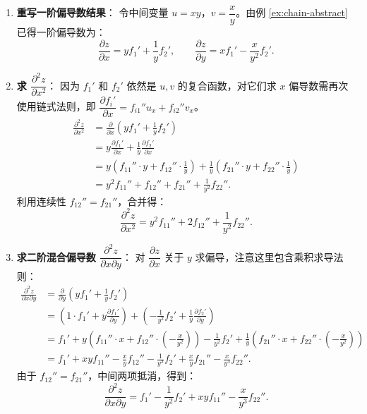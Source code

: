 \documentclass[lang=cn,11pt]{elegantbook}
\begin{document}
\begin{solution}
\begin{enumerate}
  \item \textbf{重写一阶偏导数结果}：
  令中间变量 $u=xy$，$v=\dfrac{x}{y}$。由例 \ref{ex:chain-abstract} 已得一阶偏导数为：
  \[
  \frac{\partial z}{\partial x}=yf_1'+\frac{1}{y}f_2',\qquad
  \frac{\partial z}{\partial y}=xf_1'-\frac{x}{y^2}f_2'.
  \]

  \item \textbf{求 $\dfrac{\partial^2 z}{\partial x^2}$}：
  因为 $f_1'$ 和 $f_2'$ 依然是 $u, v$ 的复合函数，对它们求 $x$ 偏导数需再次使用链式法则，即 $\dfrac{\partial f_i'}{\partial x} = f_{i1}'' u_x + f_{i2}'' v_x$。
  \begin{align*}
  \frac{\partial^2 z}{\partial x^2} &= \frac{\partial}{\partial x}\left(yf_1'+\frac{1}{y}f_2'\right) \\
  &= y\frac{\partial f_1'}{\partial x} + \frac{1}{y}\frac{\partial f_2'}{\partial x} \\
  &= y\!\left(f_{11}''\cdot y+f_{12}''\cdot\frac{1}{y}\right) + \frac{1}{y}\!\left(f_{21}''\cdot y+f_{22}''\cdot\frac{1}{y}\right) \\
  &= y^2f_{11}''+f_{12}''+f_{21}''+\frac{1}{y^2}f_{22}''.
  \end{align*}
  利用连续性 $f_{12}''=f_{21}''$，合并得：
  \[
  \boxed{\frac{\partial^2 z}{\partial x^2}=y^2f_{11}''+2f_{12}''+\frac{1}{y^2}f_{22}''}.
  \]

  \item \textbf{求二阶混合偏导数 $\dfrac{\partial^2 z}{\partial x\partial y}$}：
  对 $\dfrac{\partial z}{\partial x}$ 关于 $y$ 求偏导，注意这里包含乘积求导法则：
  \begin{align*}
  \frac{\partial^2 z}{\partial x\partial y} &= \frac{\partial}{\partial y}\left(yf_1'+\frac{1}{y}f_2'\right) \\
  &= \left(1\cdot f_1'+y\frac{\partial f_1'}{\partial y}\right) + \left(-\frac{1}{y^2}f_2'+\frac{1}{y}\frac{\partial f_2'}{\partial y}\right) \\
  &= f_1' + y\!\left(f_{11}''\cdot x+f_{12}''\cdot\left(-\frac{x}{y^2}\right)\right) - \frac{1}{y^2}f_2' + \frac{1}{y}\!\left(f_{21}''\cdot x+f_{22}''\cdot\left(-\frac{x}{y^2}\right)\right) \\
  &= f_1'+xyf_{11}''-\frac{x}{y}f_{12}''-\frac{1}{y^2}f_2'+\frac{x}{y}f_{21}''-\frac{x}{y^3}f_{22}''.
  \end{align*}
  由于 $f_{12}''=f_{21}''$，中间两项抵消，得到：
  \[
  \boxed{\frac{\partial^2 z}{\partial x\partial y}=f_1'-\frac{1}{y^2}f_2'+xyf_{11}''-\frac{x}{y^3}f_{22}''}.
  \]


\end{enumerate}
\end{solution}
\end{document}
